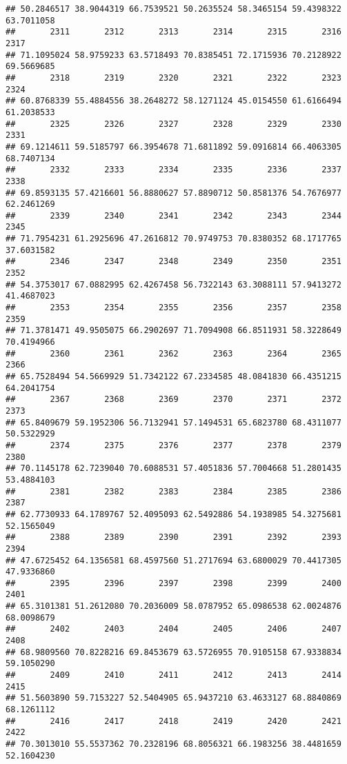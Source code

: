 \documentclass[
]{article}
\begin{document}
\begin{verbatim}
## 50.2846517 38.9044319 66.7539521 50.2635524 58.3465154 59.4398322 63.7011058 
##       2311       2312       2313       2314       2315       2316       2317 
## 71.1095024 58.9759233 63.5718493 70.8385451 72.1715936 70.2128922 69.5669685 
##       2318       2319       2320       2321       2322       2323       2324 
## 60.8768339 55.4884556 38.2648272 58.1271124 45.0154550 61.6166494 61.2038533 
##       2325       2326       2327       2328       2329       2330       2331 
## 69.1214611 59.5185797 66.3954678 71.6811892 59.0916814 66.4063305 68.7407134 
##       2332       2333       2334       2335       2336       2337       2338 
## 69.8593135 57.4216601 56.8880627 57.8890712 50.8581376 54.7676977 62.2461269 
##       2339       2340       2341       2342       2343       2344       2345 
## 71.7954231 61.2925696 47.2616812 70.9749753 70.8380352 68.1717765 37.6031582 
##       2346       2347       2348       2349       2350       2351       2352 
## 54.3753017 67.0882995 62.4267458 56.7322143 63.3088111 57.9413272 41.4687023 
##       2353       2354       2355       2356       2357       2358       2359 
## 71.3781471 49.9505075 66.2902697 71.7094908 66.8511931 58.3228649 70.4194966 
##       2360       2361       2362       2363       2364       2365       2366 
## 65.7528494 54.5669929 51.7342122 67.2334585 48.0841830 66.4351215 64.2041754 
##       2367       2368       2369       2370       2371       2372       2373 
## 65.8409679 59.1952306 56.7132941 57.1494531 65.6823780 68.4311077 50.5322929 
##       2374       2375       2376       2377       2378       2379       2380 
## 70.1145178 62.7239040 70.6088531 57.4051836 57.7004668 51.2801435 53.4884103 
##       2381       2382       2383       2384       2385       2386       2387 
## 62.7730933 64.1789767 52.4095093 62.5492886 54.1938985 54.3275681 52.1565049 
##       2388       2389       2390       2391       2392       2393       2394 
## 47.6725452 64.1356581 68.4597560 51.2717694 63.6800029 70.4417305 47.9336860 
##       2395       2396       2397       2398       2399       2400       2401 
## 65.3101381 51.2612080 70.2036009 58.0787952 65.0986538 62.0024876 68.0098679 
##       2402       2403       2404       2405       2406       2407       2408 
## 68.9809560 70.8228216 69.8453679 63.5726955 70.9105158 67.9338834 59.1050290 
##       2409       2410       2411       2412       2413       2414       2415 
## 51.5603890 59.7153227 52.5404905 65.9437210 63.4633127 68.8840869 68.1261112 
##       2416       2417       2418       2419       2420       2421       2422 
## 70.3013010 55.5537362 70.2328196 68.8056321 66.1983256 38.4481659 52.1604230 

\end{verbatim}
\end{document}
